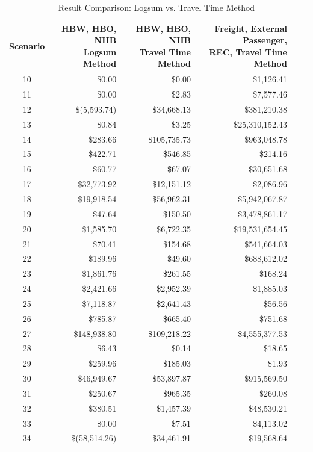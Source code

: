 \begin{table}

\caption{\label{tab:comparison} Result Comparison: Logsum vs. Travel Time Method}
\centering
\begin{tabular}[t]{crrrrr}
\toprule
Scenario & \makecell{HBW, HBO, NHB \\ Logsum Method} & \makecell{HBW, HBO, NHB\\ Travel Time Method} & \makecell{Freight, External Passenger,\\ REC, Travel Time Method}\\
\midrule
10 & \$0.00 & \$0.00 & \$1,126.41\\
11 & \$0.00 & \$2.83 & \$7,577.46\\
12 & \$(5,593.74) & \$34,668.13 & \$381,210.38\\
13 & \$0.84 & \$3.25 & \$25,310,152.43\\
14 & \$283.66 & \$105,735.73 & \$963,048.78\\
15 & \$422.71 & \$546.85 & \$214.16\\
16 & \$60.77 & \$67.07 & \$30,651.68\\
17 & \$32,773.92 & \$12,151.12 & \$2,086.96\\
18 & \$19,918.54 & \$56,962.31 & \$5,942,067.87\\
19 & \$47.64 & \$150.50 & \$3,478,861.17\\
20 & \$1,585.70 & \$6,722.35 & \$19,531,654.45\\
21 & \$70.41 & \$154.68 & \$541,664.03\\
22 & \$189.96 & \$49.60 & \$688,612.02\\
23 & \$1,861.76 & \$261.55 & \$168.24\\
24 & \$2,421.66 & \$2,952.39 & \$1,885.03\\
25 & \$7,118.87 & \$2,641.43 & \$56.56\\
26 & \$785.87 & \$665.40 & \$751.68\\
27 & \$148,938.80 & \$109,218.22 & \$4,555,377.53\\
28 & \$6.43 & \$0.14 & \$18.65\\
29 & \$259.96 & \$185.03 & \$1.93\\
30 & \$46,949.67 & \$53,897.87 & \$915,569.50\\
31 & \$250.67 & \$965.35 & \$260.08\\
32 & \$380.51 & \$1,457.39 & \$48,530.21\\
33 & \$0.00 & \$7.51 & \$4,113.02\\
34 & \$(58,514.26) & \$34,461.91 & \$19,568.64\\

\end{tabular}
\end{table}
